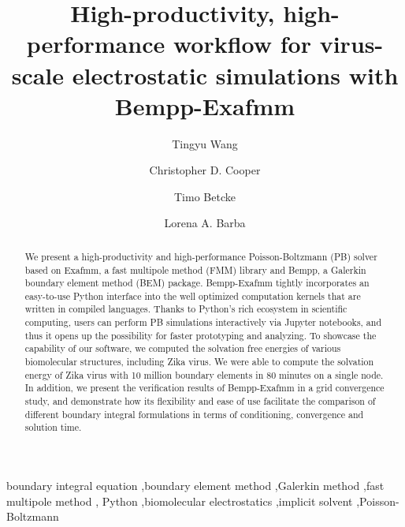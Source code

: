 \documentclass[final,5p,times,twocolumn]{elsarticle}
\begin{document}
\begin{frontmatter}
\title{High-productivity, high-performance workflow for virus-scale electrostatic simulations with Bempp-Exafmm}

\author[gwu]{Tingyu Wang}

\author[usm]{Christopher D. Cooper}

\author[ucl]{Timo Betcke}

\author[gwu]{Lorena A. Barba}

\address[gwu]{Department of Mechanical and Aerospace Engineering, The George Washington University, Washington DC}
\address[usm]{Department of Mechanical Engineering, Universidad T\'ecnica Federico Santa Mar\'ia, Valpara\'iso, Chile}
\address[ucl]{Department of Mathematics, University College London, UK}

\begin{abstract}
    We present a high-productivity and high-performance Poisson-Boltzmann (PB) solver based on Exafmm, a fast multipole method (FMM) library and Bempp, a Galerkin boundary element method (BEM) package.
    Bempp-Exafmm tightly incorporates an easy-to-use Python interface into the well optimized computation kernels that are written in compiled languages.
    Thanks to Python's rich ecosystem in scientific computing, users can perform PB simulations interactively via Jupyter notebooks, and thus it opens up the possibility for faster prototyping and analyzing.
    To showcase the capability of our software, we computed the solvation free energies of various biomolecular structures, including Zika virus.
    We were able to compute the solvation energy of Zika virus with 10 million boundary elements in 80 minutes on a single node.
    In addition, we present the verification results of Bempp-Exafmm in a grid convergence study, and demonstrate how its flexibility and ease of use facilitate the comparison of different boundary integral formulations in terms of conditioning, convergence and solution time.
\end{abstract}

\begin{keyword}
    boundary integral equation \sep boundary element method \sep Galerkin method \sep fast multipole method \sep
    Python \sep biomolecular electrostatics \sep implicit solvent \sep Poisson-Boltzmann
\end{keyword}

\end{frontmatter}
\end{document}
